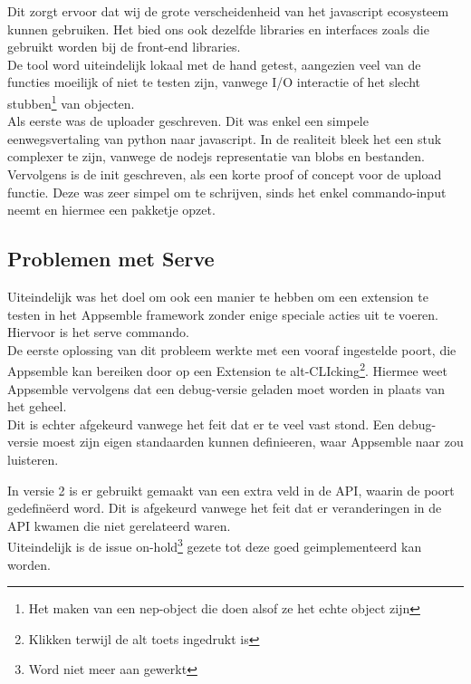 Dit zorgt ervoor dat wij de grote verscheidenheid van het javascript ecosysteem kunnen gebruiken. Het bied ons ook dezelfde libraries en interfaces zoals die gebruikt worden bij de front-end libraries. \\ 

De tool word uiteindelijk lokaal met de hand getest, aangezien veel van de functies moeilijk of niet te testen zijn, vanwege I/O interactie of het slecht stubben\footnote{Het maken van een nep-object die doen alsof ze het echte object zijn} van objecten. \\

Als eerste was de uploader geschreven. Dit was enkel een simpele eenwegsvertaling van python naar javascript. In de realiteit bleek het een stuk complexer te zijn, vanwege de nodejs representatie van blobs en bestanden. \\ 

Vervolgens is de init geschreven, als een korte proof of concept voor de upload functie. Deze was zeer simpel om te schrijven, sinds het enkel commando-input neemt en hiermee een pakketje opzet. \\

\subsection{Problemen met Serve}

Uiteindelijk was het doel om ook een manier te hebben om een extension te testen in het Appsemble framework zonder enige speciale acties uit te voeren. Hiervoor is het serve commando. \\

De eerste oplossing van dit probleem werkte met een vooraf ingestelde poort, die Appsemble kan bereiken door op een Extension te alt-CLIcking\footnote{Klikken terwijl de alt toets ingedrukt is}. Hiermee weet Appsemble vervolgens dat een debug-versie geladen moet worden in plaats van het geheel. \\

Dit is echter afgekeurd vanwege het feit dat er te veel vast stond. Een debug-versie moest zijn eigen standaarden kunnen definieeren, waar Appsemble naar zou luisteren.

In versie 2 is er gebruikt gemaakt van een extra veld in de API, waarin de poort gedefin{\"e}erd word. Dit is afgekeurd vanwege het feit dat er veranderingen in de API kwamen die niet gerelateerd waren. \\

Uiteindelijk is de issue on-hold\footnote{Word niet meer aan gewerkt} gezete tot deze goed geimplementeerd kan worden.